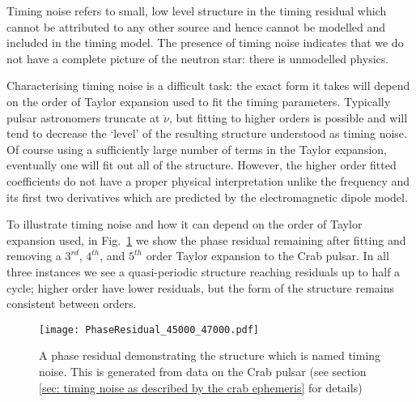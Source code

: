 Timing noise refers to small, low level structure in the timing residual which
cannot be attributed to any other source and hence cannot be modelled and
included in the timing model. The presence of timing noise indicates that we do
not have a complete picture of the neutron star: there is unmodelled physics.

Characterising timing noise is a difficult task: the exact form it takes will
depend on the order of Taylor expansion used to fit the timing parameters. Typically
pulsar astronomers truncate at $\ddot{\nu}$, but fitting to higher orders is
possible and will tend to decrease the `level' of the resulting structure
understood as timing noise. Of course using a sufficiently large number of
terms in the Taylor expansion, eventually one will fit out all of the structure.
However, the higher order fitted coefficients do not have a proper physical
interpretation unlike the frequency and its first two derivatives which are
predicted by the electromagnetic dipole model.

To illustrate timing noise and how it can depend on the order of Taylor expansion
used, in Fig.~\ref{fig: timing noise example} we show the phase residual remaining
after fitting and removing a $3^{rd}$, $4^{th}$, and $5^{th}$ order Taylor expansion to
the Crab pulsar. In all three instances we see a quasi-periodic structure reaching
residuals up to half a cycle; higher order have lower residuals, but the form
of the structure remains consistent between orders.
\begin{figure}[htb]
    \centering
    \texttt{[image: PhaseResidual\_45000\_47000.pdf]}
    \caption{A phase residual demonstrating the structure which is named timing
        noise. This is generated from data on the Crab pulsar (see section
    \ref{sec: timing noise as described by the crab ephemeris} for details)}
    \label{fig: timing noise example}
\end{figure}

